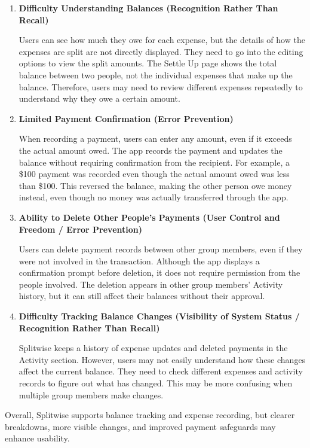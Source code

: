 \documentclass[letterpaper]{jdf}
\begin{document}
\begin{enumerate}[label=\arabic*)]

	\item \textbf{Difficulty Understanding Balances (Recognition Rather Than Recall)}
    
    Users can see how much they owe for each expense, but the details of how the expenses are split are not directly displayed. They need to go into the editing options to view the split amounts. The Settle Up page shows the total balance between two people, not the individual expenses that make up the balance. Therefore, users may need to review different expenses repeatedly to understand why they owe a certain amount.
    \item \textbf{Limited Payment Confirmation (Error Prevention)}
    
    When recording a payment, users can enter any amount, even if it exceeds the actual amount owed. The app records the payment and updates the balance without requiring confirmation from the recipient. For example, a \$100 payment was recorded even though the actual amount owed was less than \$100. This reversed the balance, making the other person owe money instead, even though no money was actually transferred through the app.
    \item \textbf{Ability to Delete Other People's Payments (User Control and Freedom / Error Prevention)}
    
    Users can delete payment records between other group members, even if they were not involved in the transaction. Although the app displays a confirmation prompt before deletion, it does not require permission from the people involved. The deletion appears in other group members' Activity history, but it can still affect their balances without their approval.
    \item \textbf{Difficulty Tracking Balance Changes (Visibility of System Status / Recognition Rather Than Recall)}
    
    Splitwise keeps a history of expense updates and deleted payments in the Activity section. However, users may not easily understand how these changes affect the current balance. They need to check different expenses and activity records to figure out what has changed. This may be more confusing when multiple group members make changes.

\end{enumerate}

Overall, Splitwise supports balance tracking and expense recording, but clearer breakdowns, more visible changes, and improved payment safeguards may enhance usability.
\end{document}
